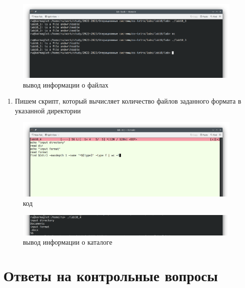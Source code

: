 \begin{figure}
\hypertarget{fig:007}{%
\centering
\includegraphics[width=1\textwidth,height=\textheight]{image/7.png}
\caption{вывод информации о файлах}\label{fig:007}
}
\end{figure}

\begin{enumerate}
\def\labelenumi{\arabic{enumi}.}
\setcounter{enumi}{3}
\tightlist
\item
  Пишем скрипт, который вычисляет количество файлов заданного формата в
  указанной директории
\end{enumerate}

\begin{figure}
\hypertarget{fig:008}{%
\centering
\includegraphics[width=1\textwidth,height=\textheight]{image/9.png}
\caption{код}\label{fig:008}
}
\end{figure}

\begin{figure}
\hypertarget{fig:009}{%
\centering
\includegraphics[width=1\textwidth,height=\textheight]{image/8.png}
\caption{вывод информации о каталоге}\label{fig:009}
}
\end{figure}

\hypertarget{ux43eux442ux432ux435ux442ux44b-ux43dux430-ux43aux43eux43dux442ux440ux43eux43bux44cux43dux44bux435-ux432ux43eux43fux440ux43eux441ux44b}{%
\chapter{Ответы на контрольные
вопросы}\label{ux43eux442ux432ux435ux442ux44b-ux43dux430-ux43aux43eux43dux442ux440ux43eux43bux44cux43dux44bux435-ux432ux43eux43fux440ux43eux441ux44b}}

